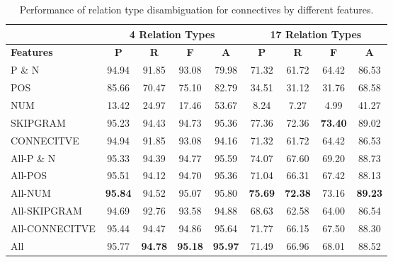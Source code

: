 \begin{table}[ht]
\centering
\begin{tabular}{|l|c|c|c|c|c|c|c|c|}
\hline
                  & \multicolumn{4}{c|}{4 Relation Types}      & \multicolumn{4}{c|}{17 Relation Types}                                    \\ \hline
\bf Features      & \bf P         & \bf R      & \bf F         & \bf A         & \bf P         & \bf R      & \bf F        & \bf A         \\ \hline
    P \& N        &     94.94     &     91.85  &     93.08     &     79.98     &     71.32     &     61.72  &     64.42    &     86.53     \\ \hline
    POS           &     85.66     &     70.47  &     75.10     &     82.79     &     34.51     &     31.12  &     31.76    &     68.58     \\ \hline
    NUM           &     13.42     &     24.97  &     17.46     &     53.67     &      8.24     &      7.27  &      4.99    &     41.27     \\ \hline
    SKIPGRAM      &     95.23     &     94.43  &     94.73     &     95.36     &     77.36     &     72.36  & \bf 73.40    &     89.02     \\ \hline
    CONNECITVE    &     94.94     &     91.85  &     93.08     &     94.16     &     71.32     &     61.72  &     64.42    &     86.53     \\ \hline
    All-P \& N    &     95.33     &     94.39  &     94.77     &     95.59     &     74.07     &     67.60  &     69.20    &     88.73     \\ \hline
    All-POS       &     95.51     &     94.12  &     94.70     &     95.36     &     71.04     &     66.31  &     67.42    &     88.13     \\ \hline
    All-NUM       & \bf 95.84     &     94.52  &     95.07     &     95.80     & \bf 75.69     & \bf 72.38  &     73.16    & \bf 89.23     \\ \hline
    All-SKIPGRAM  &     94.69     &     92.76  &     93.58     &     94.88     &     68.63     &     62.58  &     64.00    &     86.54     \\ \hline
    All-CONNECITVE&     95.44     &     94.47  &     94.86     &     95.64     &     71.77     &     66.15  &     67.50    &     88.30     \\ \hline
    All           &     95.77     & \bf 94.78  & \bf 95.18     & \bf 95.97     &     71.49     &     66.96  &     68.01    &     88.52     \\ \hline

\end{tabular}
\caption{\label{t:sense-features} Performance of relation type
disambiguation for connectives by different features. }
\end{table}

